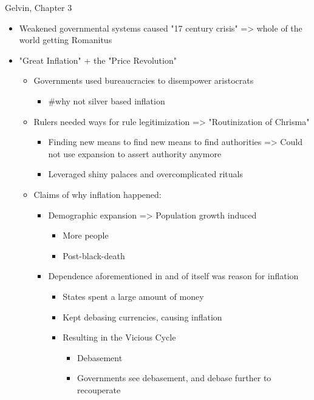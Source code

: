 \documentclass[letterpaper]{article}
\begin{document}
Gelvin, Chapter 3

\begin{itemize}
\item Weakened governmental systems caused "17 century crisis" => whole of
the world getting Romanitus
\item "Great Inflation" + the "Price Revolution"

\begin{itemize}
\item Governments used bureaucracies to disempower aristocrats

\begin{itemize}
\item \#why not silver based inflation
\end{itemize}

\item Rulers needed ways for rule legitimization => "Routinization of
Chrisma"

\begin{itemize}
\item Finding new means to find new means to find authorities => Could
not use expansion to assert authority anymore
\item Leveraged shiny palaces and overcomplicated rituals
\end{itemize}

\item Claims of why inflation happened:

\begin{itemize}
\item Demographic expansion => Population growth induced

\begin{itemize}
\item More people
\item Post-black-death
\end{itemize}

\item Dependence aforementioned in and of itself was reason for
inflation

\begin{itemize}
\item States spent a large amount of money
\item Kept debasing currencies, causing inflation
\item Resulting in the Vicious Cycle

\begin{itemize}
\item Debasement
\item Governments see debasement, and debase further to recouperate
\end{itemize}
\end{itemize}


\end{itemize}
\end{itemize}
\end{itemize}
\end{document}
